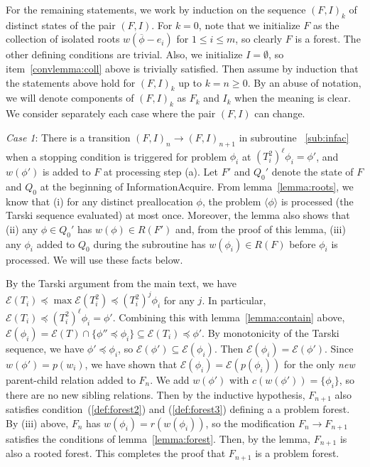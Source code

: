 \documentclass[11pt,reqno]{amsart}
\theoremstyle{definition}
\numberwithin{equation}{section}
\newcommand{\ol}{\overline}
\newcommand{\lag}{\langle}
\newcommand{\rag}{\rangle}
\newcommand{\pre}{\phi}
\newcommand{\sub}{\subseteq}
\newcommand{\fix}{\mathcal{E}}
\newcommand{\peq}{\preceq}
\newcommand{\toppre}{\ol{\pre}}
\newcommand{\acto}{Q_0}
\newcommand{\coll}{I}
\newcommand{\forest}{F}
\newcommand{\pair}{(F,I)}
\newcommand{\roott}{R}
\newcommand{\infacbstopa}{(a)\xspace}
\begin{document}
For the remaining statements, we work by induction on the sequence $\pair_k$ of distinct states of the pair $\pair$. 
For $k = 0$, note that we initialize $F$ as the collection of isolated roots $w(\toppre - e_i)$ for $1 \leq i \leq m$, so clearly $F$ is a forest.
The other defining conditions are trivial.
Also, we initialize $\coll = \emptyset$, so item~\ref{convlemma:coll} above is trivially satisfied. 
Then assume by induction that the statements above hold for $\pair_k$ up to $k = n \geq 0$. 
By an abuse of notation, we will denote components of $\pair_k$ as $\forest_k$ and $\coll_k$ when the meaning is clear.
We consider separately each case where the pair $\pair$ can change.

\emph{Case 1}: There is a transition $\pair_n \to \pair_{n +1}$ in subroutine ~\ref{sub:infac} when a stopping condition is triggered for problem $\pre_i$ at $(T_i^2)^{\ell}\pre_i = \pre'$, and $w(\pre')$ is added to $\forest$ at processing step \infacbstopa. 
Let $\forest'$ and $\acto'$ denote the state of $\forest$ and $\acto$ at the beginning of InformationAcquire.
From lemma~\ref{lemma:roots}, we know that (i) for any distinct preallocation $\pre$, the problem $\lag \pre \rag$ is processed (the Tarski sequence evaluated) at most once.
Moreover, the lemma also shows that (ii) any $\pre \in \acto'$ has $w(\pre) \in \roott(\forest')$ and, from the proof of this lemma, (iii) any $\pre_i$ added to $\acto$ during the subroutine has $w(\pre_i) \in \roott(\forest)$ before $\pre_i$ is processed. 
We will use these facts below. 

By the Tarski argument from the main text, we have $\fix(T_i) \peq \max \fix(T_i^2) \peq (T_i^2)^{j}\pre_i$ for any $j$. 
In particular, $\fix(T_i) \peq (T_i^2)^{\ell}\pre_i = \pre'$.
Combining this with lemma~\ref{lemma:contain} above, $\fix(\pre_i) = \fix(T) \cap \{\pre'' \peq \pre_i\} \sub \fix(T_i) \peq \pre'$. 
By monotonicity of the Tarski sequence, we have $\pre' \peq \pre_i$, so $\fix(\pre') \sub \fix(\pre_i)$. 
Then $\fix(\pre_i) = \fix(\pre')$.
Since $w(\pre') = p(w_i)$, we have shown that $\fix(\pre_i) = \fix(p(\pre_i))$ for the only \emph{new} parent-child relation added to $\forest_n$. 
We add $w(\pre')$ with $c(w(\pre')) = \{\pre_i\}$, so there are no new sibling relations. 
Then by the inductive hypothesis, $\forest_{n+1}$ also satisfies condition~(\ref{def:forest2}) and (\ref{def:forest3}) defining a a problem forest.
By (iii) above, $\forest_n$ has $w(\pre_i) = r(w(\pre_i))$, so the modification $\forest_n \to \forest_{n + 1}$ satisfies the conditions of lemma~\ref{lemma:forest}.
Then, by the lemma, $\forest_{n + 1}$ is also a rooted forest. 
This completes the proof that $\forest_{n + 1}$ is a problem forest.
\end{document}
